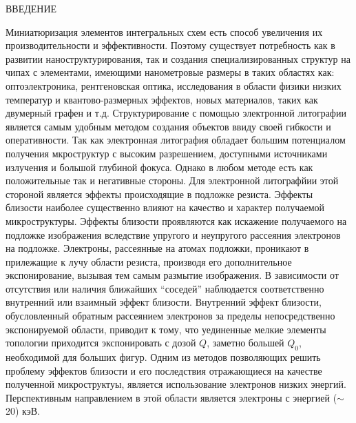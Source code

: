 \begin{center}
ВВЕДЕНИЕ
\end{center}
\vspace*{1cm}

Миниатюризация элементов интегральных схем есть способ увеличения их
производительности и эффективности. Поэтому существует потребность как
в развитии наноструктурирования, так и создания специализированных
структур на чипах с элементами, имеющими нанометровые размеры в таких
областях как: оптоэлектроника, рентгеновская оптика, исследования в
области физики низких температур и квантово-размерных эффектов, новых
материалов, таких как двумерный графен и т.д.
Структурирование с помощью электронной литографии является самым
удобным методом создания объектов ввиду своей гибкости и оперативности.
Так как электронная литография обладает большим потенциалом получения 
мкроструктур с высоким разрешением, доступными источниками излучения и
большой глубиной фокуса. Однако в любом методе есть как положительные 
так и негативные стороны. Для электронной литографйии этой стороной 
является эффекты происходящие в подложке резиста. Эффекты близости
наиболее существенно влияют на качество и характер получаемой
микроструктуры. Эффекты близости проявляются как искажение получаемого 
на подложке изображения вследствие упругого и неупругого рассеяния 
электронов на подложке. Электроны, рассеянные на атомах подложки, 
проникают в прилежащие к лучу области резиста, производя его 
дополнительное экспонирование, вызывая тем самым размытие изображения.
В зависимости от отсутствия или наличия ближайших “соседей” наблюдается 
соответственно внутренний или взаимный эффект близости. Внутренний эффект 
близости, обусловленный обратным рассеянием электронов за пределы 
непосредственно экспонируемой области, приводит к тому, что уединенные 
мелкие элементы топологии приходится экспонировать с дозой $Q$, заметно 
большей $Q_0$, необходимой для больших фигур. 
Одним из методов позволяющих решить проблему эффектов близости и
его последствия отражающиеся на качестве полученной микроструктуы, 
является использование электронов низких энергий. Перспективным 
направлением в этой области является электроны с энергией (\(\sim\)20) кэВ.









